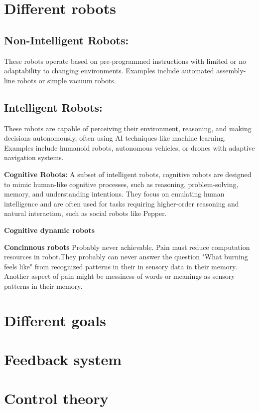 \section{Different robots}

    \subsection{Non-Intelligent Robots:} These robots operate based on pre-programmed instructions with limited or no adaptability to changing environments. Examples include automated assembly-line robots or simple vacuum robots. 

    \subsection{Intelligent Robots:} These robots are capable of perceiving their environment, reasoning, and making decisions autonomously, often using AI techniques like machine learning. Examples include humanoid robots, autonomous vehicles, or drones with adaptive navigation systems. 

        \textbf{Cognitive Robots:} A subset of intelligent robots, cognitive robots are designed to mimic human-like cognitive processes, such as reasoning, problem-solving, memory, and understanding intentions. They focus on emulating human intelligence and are often used for tasks requiring higher-order reasoning and natural interaction, such as social robots like Pepper. 

        \textbf{Cognitive dynamic robots}

        \textbf{Concinnous robots}
        Probably never achievable. Pain must reduce computation resources in robot.They probably can never answer the question "What burning feels like" from recognized patterns in their in sensory data in their memory. Another aspect of pain might be messiness of words or meanings as sensory patterns in their memory.



\section{Different goals}
\section{Feedback system}

\section{Control theory}

